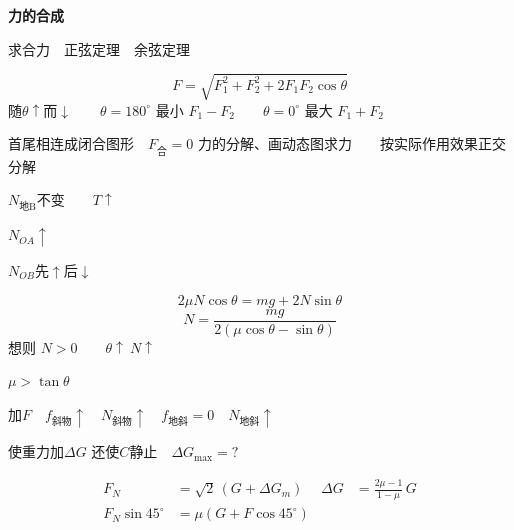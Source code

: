 \textbf{力的合成}

求合力　正弦定理　余弦定理

\[
F=\sqrt{F_1^2+F_2^2+2F_1F_2\cos\theta}
\]
随$\theta\uparrow$而$\downarrow$　　$\theta=180^\circ$ 最小 $F_1-F_2$　　$\theta=0^\circ$ 最大 $F_1+F_2$


首尾相连成闭合图形　$F_{\text{合}}=0$
力的分解、画动态图求力　　按实际作用效果正交分解


$N_{\text{地B}}$不变　　$T\uparrow$


$N_{OA}\uparrow$

$N_{OB}$先$\uparrow$后$\downarrow$

\[
2\mu N\cos\theta=mg+2N\sin\theta
\]
\[
N=\frac{mg}{2(\mu\cos\theta-\sin\theta)}
\]
想则 $N>0$　　$\theta\uparrow\ N\uparrow$ %

$\mu>\tan\theta$

加$F$　$f_{\text{斜物}}\uparrow$　$N_{\text{斜物}}\uparrow$　$f_{\text{地斜}}=0$　$N_{\text{地斜}}\uparrow$
\begin{problem}
使重力加$\Delta G$ 还使$C$静止　$\Delta G_{\max}=?$ %


\begin{solution}
\begin{align*}
F_N&=\sqrt2\,(G+\Delta G_m) & \Delta G&=\frac{2\mu-1}{1-\mu}\,G\\
F_N\sin45^\circ&=\mu(G+F\cos45^\circ)
\end{align*}
\end{solution}
\end{problem}
